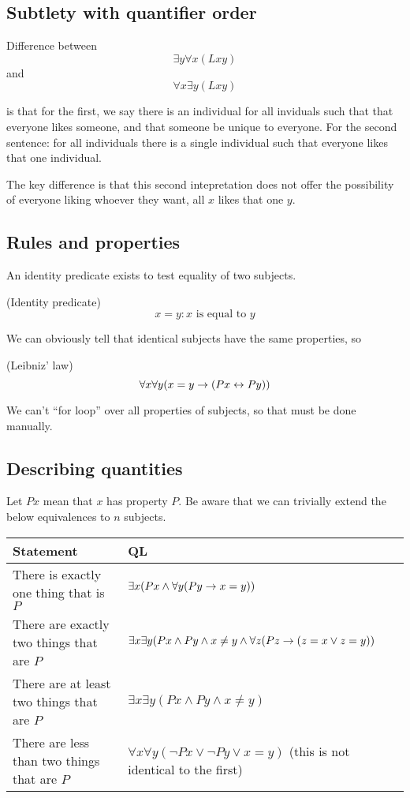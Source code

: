 \subsection{Subtlety with quantifier order}

Difference between
$$\exists y\forall x (Lxy)$$
and
$$\forall x\exists y(Lxy)$$

is that for the first, we say there is an individual for all inviduals such that that everyone likes someone, and that someone  be unique to everyone.
For the second sentence: for all individuals there is a single individual such that everyone likes that one individual.

The key difference is that this second intepretation does not offer the possibility of everyone liking whoever they want, all $x$ likes that one $y$.

\subsection{Rules and properties}

An identity predicate exists to test equality of two subjects.

\begin{definition} (Identity predicate)
    $$x=y:\text{$x$ is equal to $y$}$$
\end{definition}

We can obviously tell that identical subjects have the same properties, so

\begin{definition} (Leibniz' law)
    $$\forall x\forall y(x=y\rightarrow (Px\leftrightarrow Py))$$
\end{definition}

We can't ``for loop'' over all properties of subjects, so that must be done manually.

\subsection{Describing quantities}

Let $Px$ mean that $x$ has property $P$. Be aware that we can trivially extend the below equivalences to $n$ subjects.

\begin{tabular}{l|l}
    Statement & QL\\
    \hline
    \hline
    There is exactly one thing that is $P$ & $\exists x(Px\land \forall y(Py\rightarrow x=y))$\\
    There are exactly two things that are $P$ & $\exists x\exists y(Px\land Py\land x\neq y\land \forall z(Pz\rightarrow (z=x\lor z=y))$\\
    There are at least two things that are $P$ & $\exists x\exists y(Px\land Py\land x\neq y)$\\
    There are less than two things that are $P$ & $\forall x\forall y(\lnot Px\lor \lnot Py\lor x=y)$ (this is not identical to the first)\\ 
\end{tabular}

